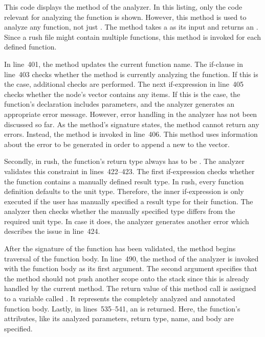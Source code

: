 
This code displays the  method of the analyzer.
In this listing, only the code relevant for analyzing the  function is shown.
However, this method is used to analyze any function, not just .
The method  takes a  as its input and returns an .
Since a rush file might contain multiple functions, this method is invoked for each defined function.

In line~401, the method updates the current function name.
The if-clause in line~403 checks whether the method is currently analyzing the  function.
If this is the case, additional checks are performed.
The next if-expression in line~405 checks whether the node's  vector contains any items.
If this is the case, the  function's declaration includes parameters, and the analyzer generates an appropriate error message.
However, error handling in the analyzer has not been discussed so far.
As the method's signature states, the method cannot return any errors.
Instead, the  method is invoked in line~406.
This method uses information about the error to be generated in order to append a new  to the  vector.

Secondly, in rush, the  function's return type always has to be \qVerb{()}.
The analyzer validates this constraint in lines~422--423.
The first if-expression checks whether the function contains a manually defined result type.
In rush, every function definition defaults to the unit type.
Therefore, the inner if-expression is only executed if the user has manually specified a result type for their  function.
The analyzer then checks whether the manually specified type differs from the required unit type.
In case it does, the analyzer generates another error which describes the issue in line~424.

After the signature of the  function has been validated, the method begins traversal of the function body.
In line~490, the  method of the analyzer is invoked with the function body as its first argument.
The second argument specifies that the method should not push another scope onto the stack since this is already handled by the current method.
The return value of this method call is assigned to a variable called .
It represents the completely analyzed and annotated function body.
Lastly, in lines~535--541, an  is returned.
Here, the function's attributes, like its analyzed parameters, return type, name, and body are specified.

